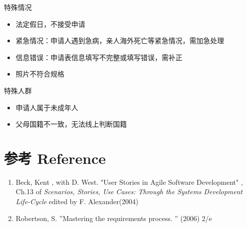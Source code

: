 特殊情况

\begin{itemize}
\tightlist
\item
  法定假日，不接受申请
\item
  紧急情况：申请人遇到急病，亲人海外死亡等紧急情况，需加急处理
\item
  信息错误：申请表信息填写不完整或填写错误，需补正
\item
  照片不符合规格
\end{itemize}

特殊人群

\begin{itemize}
\tightlist
\item
  申请人属于未成年人
\item
  父母国籍不一致，无法线上判断国籍
\end{itemize}

\hypertarget{ux53c2ux8003-reference}{%
\section{参考 Reference}\label{ux53c2ux8003-reference}}

\begin{enumerate}
\tightlist
\item
  Beck, Kent , with D. West. "User Stories in Agile Software
  Development" , Ch.13 of \emph{Scenarios, Stories, Use Cases: Through
  the Systems Development Life-Cycle} edited by F. Alexander(2004)\\
\item
  Robertson, S. ''Mastering the requirements process. '' (2006) 2/e\\
\end{enumerate}


